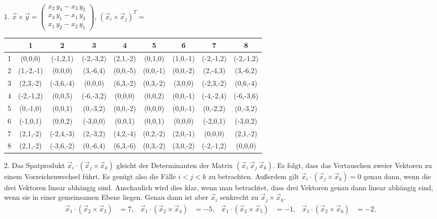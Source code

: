 \documentclass[11pt]{exam}
\begin{document}
\begin{questions}
\begin{solution}\\
	1. $\vec{x}\times\vec{y}=\left(\begin{array}{c}
		x_2\, y_3-x_3\, y_2\\x_3\, y_1-x_1\, y_3\\x_1\, y_2-x_2\, y_1
	\end{array}\right)$, $(\vec{x}_i\times\vec{x}_j)^T=$
	\begin{center}
		\begin{tabular}{|c|c|c|c|c|c|c|c|c|}
			\hline \diagbox{i}{j}&1&2&3&4&5&6&7&8\\
			\hline 1&(0,0,0)&(-1,2,1)&(-2,-3,2)&(2,1,-2)&(0,1,0)&(1,0,-1)&(-2,-1,2)&(-2,-1,2)\\
			\hline 2&(1,-2,-1)&(0,0,0)&(3,-6,4)&(0,0,-5)&(0,0,-1)&(0,0,-2)&(2,-4,3)&(3,-6,2)\\
			\hline 3&(2,3,-2)&(-3,6,-4)&(0,0,0)&(6,3,-2)&(0,3,-2)&(3,0,0)&(-2,3,-2)&(0,6,-4)\\
			\hline 4&(-2,-1,2)&(0,0,5)&(-6,-3,2)&(0,0,0)&(0,0,2)&(0,0,-1)&(-4,-2,4)&(-6,-3,6)\\
			\hline 5&(0,-1,0)&(0,0,1)&(0,-3,2)&(0,0,-2)&(0,0,0)&(0,0,-1)&(0,-2,2)&(0,-3,2)\\
			\hline 6&(-1,0,1)&(0,0,2)&(-3,0,0)&(0,0,1)&(0,0,1)&(0,0,0)&(-2,0,1)&(-3,0,2)\\
			\hline 7&(2,1,-2)&(-2,4,-3)&(2,-3,2)&(4,2,-4)&(0,2,-2)&(2,0,-1)&(0,0,0)&(2,1,-2)\\
			\hline 8&(2,1,-2)&(-3,6,-2)&(0,-6,4)&(6,3,-6)&(0,3,-2)&(3,0,-2)&(-2,-1,2)&(0,0,0)\\
			\hline
		\end{tabular}
	\end{center}
	2. Das Spatprodukt $\vec{x}_i\cdot(\vec{x}_j\times\vec{x}_k)$ gleicht der Determinanten der Matrix $\left(\vec{x}_i\ \vec{x}_j\ \vec{x}_k\right)$. Es folgt, dass das Vertauschen zweier Vektoren zu einem Vorzeichenwechsel führt. Es genügt also die Fälle $i<j<k$ zu betrachten. Außerdem gilt $\vec{x}_i\cdot(\vec{x}_j\times\vec{x}_k)=0$ genau dann, wenn die drei Vektoren linear abhängig sind. Anschaulich wird dies klar, wenn man betrachtet, dass drei Vektoren genau dann linear abhängig sind, wenn sie in einer gemeinsamen Ebene liegen. Genau dann ist aber $\vec{x}_i$ senkrecht zu $\vec{x}_j\times\vec{x}_k$.
	\begin{align*}
		\vec{x}_1\cdot(\vec{x}_2\times\vec{x}_3)&=7,&
		\vec{x}_1\cdot(\vec{x}_2\times\vec{x}_4)&=-5,&
		\vec{x}_1\cdot(\vec{x}_2\times\vec{x}_5)&=-1,&
		\vec{x}_1\cdot(\vec{x}_2\times\vec{x}_6)&=-2,\\

\end{align*}
\end{solution}
\end{questions}
\end{document}
